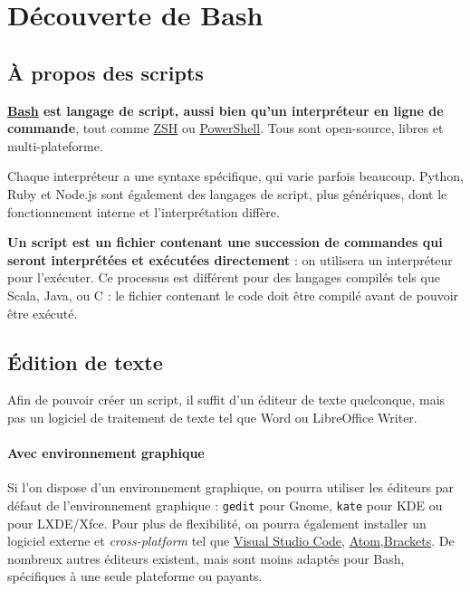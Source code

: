 \section{Découverte de Bash}

\subsection{À propos des scripts}

\textbf{\href{https://www.gnu.org/software/bash/}{Bash} est langage de script, aussi bien qu'un interpréteur en ligne de commande}, tout comme \href{https://www.zsh.org/}{ZSH} ou \href{https://docs.microsoft.com/en-us/powershell/}{PowerShell}. Tous sont open-source, libres et multi-plateforme.

Chaque interpréteur a une syntaxe spécifique, qui varie parfois beaucoup. Python, Ruby et Node.js sont également des langages de script, plus génériques, dont le fonctionnement interne et l'interprétation diffère.

\textbf{Un script est un fichier contenant une succession de commandes qui seront interprétées et exécutées directement} : on utilisera un interpréteur pour l’exécuter. Ce processus est différent pour des langages compilés tels que Scala, Java, ou C : le fichier contenant le code doit être compilé avant de pouvoir être exécuté.

\subsection{Édition de texte}

Afin de pouvoir créer un script, il suffit d'un éditeur de texte quelconque, mais pas un logiciel de traitement de texte tel que Word ou LibreOffice Writer.

\paragraph{Avec environnement graphique}

Si l'on dispose d'un environnement graphique, on pourra utiliser les éditeurs par défaut de l'environnement graphique : \texttt{gedit}  pour Gnome, \texttt{kate}  pour KDE ou   pour LXDE/Xfce. \newline 
Pour plus de flexibilité, on pourra également installer un logiciel externe et \textit{cross-platform} tel que \href{https://code.visualstudio.com}{Visual Studio Code},  \href{https://atom.io}{Atom},\href{http://brackets.io}{Brackets}. De nombreux autres éditeurs existent, mais sont moins adaptés pour Bash, spécifiques à une seule plateforme ou payants.

